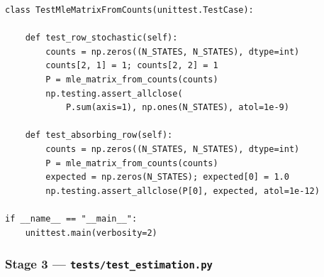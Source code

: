 \documentclass[12pt,a4paper]{article}
\begin{document}
\begin{lstlisting}[caption={test\_transitions.py --- Stage 2: Transition Extraction}]
class TestMleMatrixFromCounts(unittest.TestCase):

    def test_row_stochastic(self):
        counts = np.zeros((N_STATES, N_STATES), dtype=int)
        counts[2, 1] = 1; counts[2, 2] = 1
        P = mle_matrix_from_counts(counts)
        np.testing.assert_allclose(
            P.sum(axis=1), np.ones(N_STATES), atol=1e-9)

    def test_absorbing_row(self):
        counts = np.zeros((N_STATES, N_STATES), dtype=int)
        P = mle_matrix_from_counts(counts)
        expected = np.zeros(N_STATES); expected[0] = 1.0
        np.testing.assert_allclose(P[0], expected, atol=1e-12)

if __name__ == "__main__":
    unittest.main(verbosity=2)
\end{lstlisting}

\subsubsection{Stage 3 --- \texttt{tests/test\_estimation.py}}
\end{document}
